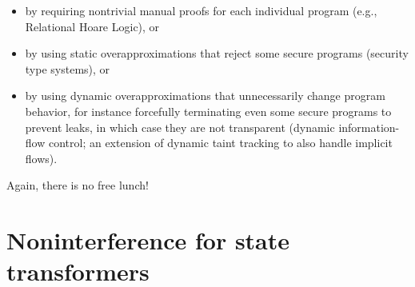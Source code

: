 \documentclass[12pt]{report}
\begin{document}
\begin{itemize}
\item  by requiring nontrivial manual proofs for each individual
          program (e.g., Relational Hoare Logic), or

\item  by using static overapproximations that reject some secure
          programs (security type systems), or

\item  by using dynamic overapproximations that unnecessarily
          change program behavior, for instance forcefully terminating
          even some secure programs to prevent leaks, in which case
          they are not transparent (dynamic information-flow control;
          an extension of dynamic taint tracking to also handle
          implicit flows).

\end{itemize}


    Again, there is no free lunch! 
\begin{coqdoccode}
\coqdocemptyline
\end{coqdoccode}
\section{Noninterference for state transformers}
\end{document}
